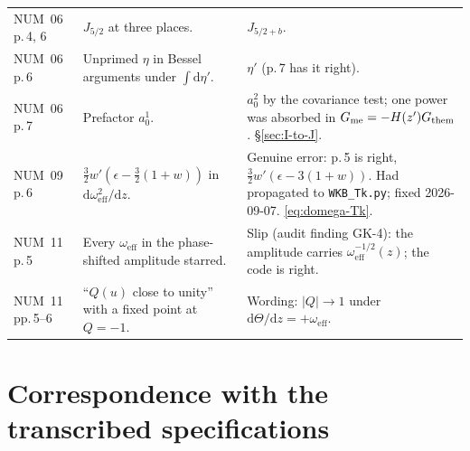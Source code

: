 \documentclass[11pt,a4paper]{article}
\newcommand{\dd}{\mathrm{d}}
\newcommand{\om}{\omega_{\mathrm{eff}}}
\newcommand{\eps}{\epsilon}
\newcommand{\note}[1]{\textsf{#1}}
\theoremstyle{remark}
\begin{document}
\begin{longtable}{p{2.6cm}p{5.4cm}p{6.8cm}}
\note{NUM}~06 p.\,4, 6 & $J_{5/2}$ at three places. & $J_{5/2+b}$. \\
\note{NUM}~06 p.\,6 & Unprimed $\eta$ in Bessel arguments under $\int\dd\eta'$. & $\eta'$ (p.\,7 has it right). \\
\note{NUM}~06 p.\,7 & Prefactor $a_0^1$. & $a_0^2$ by the covariance test; one power was absorbed in $G_{\rm me} = -H(z')G_{\rm them}$. \S\ref{sec:I-to-J}. \\
\note{NUM}~09 p.\,6 & $\tfrac32w'(\eps-\tfrac32(1+w))$ in $\dd\om^2/\dd z$. & Genuine error: p.\,5 is right, $\tfrac32w'(\eps-3(1+w))$. Had propagated to \texttt{WKB\_Tk.py}; fixed 2026-09-07. \eqref{eq:domega-Tk}. \\
\note{NUM}~11 p.\,5 & Every $\om$ in the phase-shifted amplitude starred. & Slip (audit finding GK-4): the amplitude carries $\om^{-1/2}(z)$; the code is right. \\
\note{NUM}~11 pp.\,5--6 & ``$Q(u)$ close to unity'' with a fixed point at $Q=-1$. & Wording: $|Q|\to1$ under $\dd\Theta/\dd z = +\om$. \\
\bottomrule
\end{longtable}

\section{Correspondence with the transcribed specifications}
\label{app:correspondence}
\end{document}
